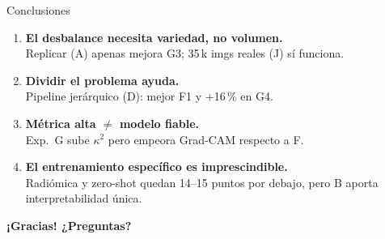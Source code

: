 \documentclass[aspectratio=169, 11pt]{beamer}
\begin{document}
\begin{frame}{Conclusiones}

  \begin{enumerate}
    \item \textbf{El desbalance necesita variedad, no volumen.}\\
          {\small Replicar (A) apenas mejora G3; 35\,k imgs reales (J)
          sí funciona.}

    \item \textbf{Dividir el problema ayuda.}\\
          {\small Pipeline jerárquico (D): mejor F1 y +16\,\% en G4.}

    \item \textbf{Métrica alta $\neq$ modelo fiable.}\\
          {\small Exp.~G sube $\kappa^2$ pero empeora Grad-CAM respecto a F.}

    \item \textbf{El entrenamiento específico es imprescindible.}\\
          {\small Radiómica y zero-shot quedan 14--15 puntos por debajo,
          pero B aporta interpretabilidad única.}
  \end{enumerate}

  \vspace{8pt}
  \centering
  \large\textbf{¡Gracias! ¿Preguntas?}
\end{frame}
\end{document}

